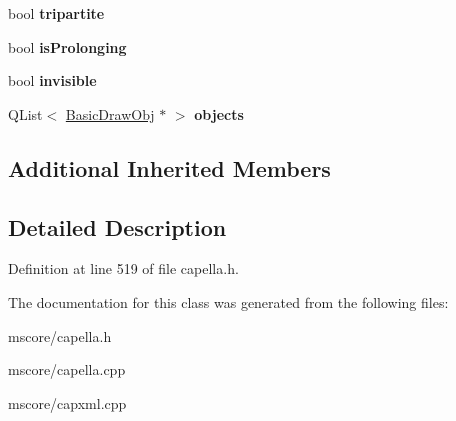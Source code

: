 \begin{DoxyCompactItemize}
bool {\bfseries tripartite}
\item 
\mbox{\label{class_ms_1_1_basic_durational_obj_a75ccbe1bfa59cf97da70165cc38c809f}} 
bool {\bfseries is\+Prolonging}
\item 
\mbox{\label{class_ms_1_1_basic_durational_obj_a84ea3c879987dc058280d9574c2e8669}} 
bool {\bfseries invisible}
\item 
\mbox{\label{class_ms_1_1_basic_durational_obj_a29abae23d2dae4783a88f375c7419623}} 
Q\+List$<$ \hyperlink{class_ms_1_1_basic_draw_obj}{Basic\+Draw\+Obj} $\ast$ $>$ {\bfseries objects}
\end{DoxyCompactItemize}
\subsection*{Additional Inherited Members}


\subsection{Detailed Description}


Definition at line 519 of file capella.\+h.



The documentation for this class was generated from the following files\+:\begin{DoxyCompactItemize}
\item 
mscore/capella.\+h\item 
mscore/capella.\+cpp\item 
mscore/capxml.\+cpp\end{DoxyCompactItemize}
